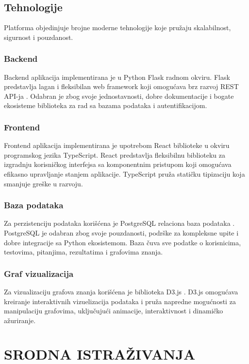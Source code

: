 \documentclass[conference]{IEEEtran}
\begin{document}
\subsection{Tehnologije}

Platforma objedinjuje brojne moderne tehnologije koje pružaju skalabilnost, sigurnost i pouzdanost.

\subsubsection{Backend}
Backend aplikacija implementirana je u Python Flask radnom okviru. Flask predstavlja lagan i fleksibilan web framework koji omogućava brz razvoj REST API-ja \cite{flask2020}. Odabran je zbog svoje jednostavnosti, dobre dokumentacije i bogate ekosisteme biblioteka za rad sa bazama podataka i autentifikacijom.

\subsubsection{Frontend}
Frontend aplikacija implementirana je upotrebom React biblioteke u okviru programskog jezika TypeScript. React predstavlja fleksibilnu biblioteku za izgradnju korisničkog interfejsa \cite{react2020} sa komponentnim pristupom koji omogućava efikasno upravljanje stanjem aplikacije. TypeScript pruža statičku tipizaciju koja smanjuje greške u razvoju.

\subsubsection{Baza podataka}
Za perzistenciju podataka korišćena je PostgreSQL relaciona baza podataka \cite{postgresql2020}. PostgreSQL je odabran zbog svoje pouzdanosti, podrške za kompleksne upite i dobre integracije sa Python ekosistemom. Baza čuva sve podatke o korisnicima, testovima, pitanjima, rezultatima i grafovima znanja.

\subsubsection{Graf vizualizacija}
Za vizualizaciju grafova znanja korišćena je biblioteka D3.js \cite{d3js2020}. D3.js omogućava kreiranje interaktivnih vizuelizacija podataka i pruža napredne mogućnosti za manipulaciju grafovima, uključujući animacije, interaktivnost i dinamičko ažuriranje.

\section{SRODNA ISTRAŽIVANJA}
\end{document}
